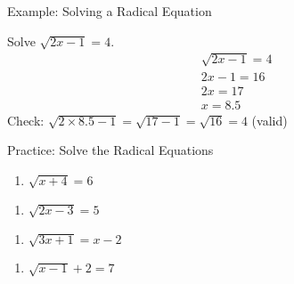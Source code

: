 \documentclass[aspectratio=169]{beamer}
\begin{document}
\begin{frame}{Example: Solving a Radical Equation}
\begin{tcolorbox}[colback=lightgray,colframe=accent,title=Example]
\footnotesize
Solve $\sqrt{2x-1} = 4$.
\begin{align*}
  &\sqrt{2x-1} = 4 \\
  &2x-1 = 16 \\
  &2x = 17 \\
  &x = 8.5
\end{align*}
Check: $\sqrt{2\times8.5-1} = \sqrt{17-1} = \sqrt{16} = 4$ (valid)
\end{tcolorbox}
\vspace{0.5em}
\begin{center}
\end{center}
\end{frame}

\begin{frame}{Practice: Solve the Radical Equations}
\begin{tcolorbox}[colback=lightgray,colframe=accent,title=Practice Problems]
\footnotesize
\begin{enumerate}
  \item $\sqrt{x+4} = 6$
\end{enumerate}
\begin{enumerate}
  \item $\sqrt{2x-3} = 5$
\end{enumerate}
\begin{enumerate}
  \item $\sqrt{3x+1} = x-2$
\end{enumerate}
\begin{enumerate}
  \item $\sqrt{x-1} + 2 = 7$
\end{enumerate}
\end{tcolorbox}
\end{frame}
\end{document}
